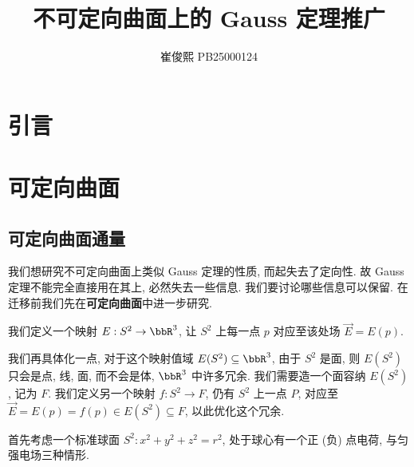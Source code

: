 \documentclass[9pt,a4paper,twoside]{../rho-class/rho}
\title{不可定向曲面上的 Gauss 定理推广}
\author{崔俊熙 PB25000124}
\renewcommand{\vec}{\overrightarrow}
\begin{document}
\maketitle
\thispagestyle{firststyle}


\section{引言} \label{sec:introduction}

\section{可定向曲面} \label{sec:orientable-surfaces}

\subsection{可定向曲面通量} \label{subsec:orientable-surface-flux}

我们想研究不可定向曲面上类似 Gauss 定理的性质, 而起失去了定向性.
故 Gauss 定理不能完全直接用在其上, 必然失去一些信息.
我们要讨论哪些信息可以保留. 在迁移前我们先在\textbf{可定向曲面}中进一步研究.

我们定义一个映射 $E: S^2 \to \bbR^3$, 让 $S^2$ 上每一点 $p$ 对应至该处场 $\vec{E} = E(p)$.

我们再具体化一点, 对于这个映射值域 $E(S^2) \subseteq \bbR^3$, 由于 $S^2$ 是面,
则 $E(S^2)$ 只会是点, 线, 面, 而不会是体, $\bbR^3$ 中许多冗余. 我们需要造一个面容纳 $E(S^2)$, 记为 $F$.
我们定义另一个映射 $f: S^2 \to F$, 仍有 $S^2$ 上一点 $P$,
对应至 $\vec{E} = E(p) = f(p) \in E(S^2) \subseteq F$, 以此优化这个冗余.

首先考虑一个标准球面 $S^2: x^2 + y^2 + z^2 = r^2$, 处于球心有一个正 (负) 点电荷, 与匀强电场三种情形.
\end{document}

